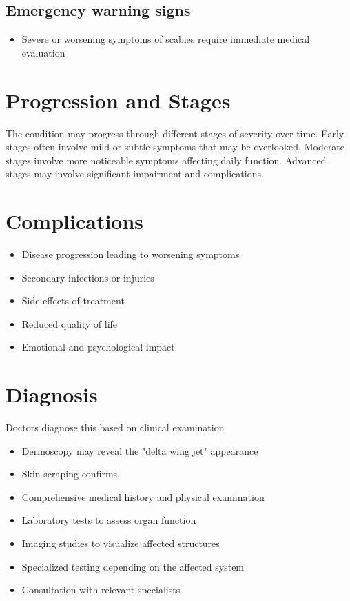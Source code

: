 \subsection{Emergency warning signs}
\begin{itemize}[noitemsep]
  \item Severe or worsening symptoms of scabies require immediate medical evaluation
\end{itemize}
\section{Progression and Stages}
The condition may progress through different stages of severity over time. Early stages often involve mild or subtle symptoms that may be overlooked. Moderate stages involve more noticeable symptoms affecting daily function. Advanced stages may involve significant impairment and complications.
\section{Complications}
\begin{itemize}[noitemsep]
  \item Disease progression leading to worsening symptoms
  \item Secondary infections or injuries
  \item Side effects of treatment
  \item Reduced quality of life
  \item Emotional and psychological impact
\end{itemize}
\section{Diagnosis}
Doctors diagnose this based on clinical examination

\begin{itemize}[noitemsep]
  \item Dermoscopy may reveal the "delta wing jet" appearance
  \item Skin scraping confirms.
  \item Comprehensive medical history and physical examination
  \item Laboratory tests to assess organ function
  \item Imaging studies to visualize affected structures
  \item Specialized testing depending on the affected system
  \item Consultation with relevant specialists
\end{itemize}
